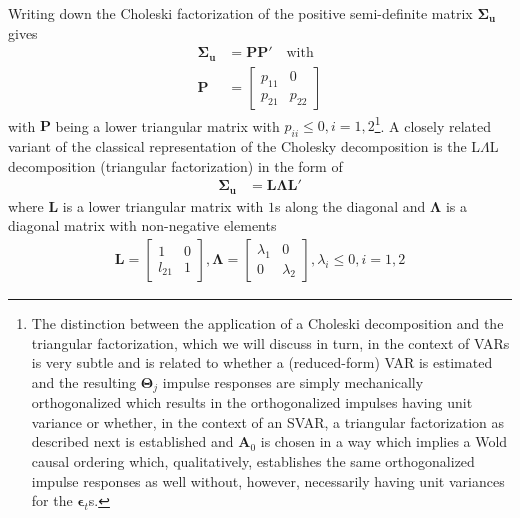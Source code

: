 \documentclass[a4paper,11pt,listof=nochaptergap,oneside,pointednumbers,bibtotoc,bigheadings,liststotoc,hidelinks]{scrbook}
\theoremstyle{mysatz}
\theoremstyle{mydefinition}
\theoremstyle{mytheorem}
\theoremstyle{mybemerkung}
\newcommand{\vect}[1]{\boldsymbol{\mathbf{#1}}}
\begin{document}
Writing down the Choleski factorization of the positive semi-definite matrix $\vect{\Sigma_u}$ gives
\begin{equation} \label{eq:svar14}
\begin{split}
 		\vect{\Sigma_u} & = \vect{P}\vect{P'} \quad \text{with} \\
		\vect{P} & = \begin{bmatrix}
    							p_{11} & 0 \\
							p_{21} & p_{22}
 							\end{bmatrix}
\end{split}								
\end{equation}
with $\vect{P}$ being a lower triangular matrix with $p_{ii} \leq 0, i = 1, 2$\footnote{The distinction between the application of a Choleski decomposition and the triangular factorization, which we will discuss in turn, in the context of VARs is very subtle and is related to whether a (reduced-form) VAR is estimated and the resulting $\vect{\Theta}_j$ impulse responses are simply mechanically orthogonalized which results in the orthogonalized impulses having unit variance or whether, in the context of an SVAR, a triangular factorization as described next is established and $\vect{A}_0$ is chosen in a way which implies a Wold causal ordering which, qualitatively, establishes the same orthogonalized impulse responses as well without, however, necessarily having unit variances for the $\vect{\epsilon}_t$s.}. A closely related variant of the classical representation of the Cholesky decomposition is the L$\Lambda$L decomposition (triangular factorization) in the form of 
\begin{equation} \label{eq:svar15}
\begin{split}
 		\vect{\Sigma_u} & = \vect{L}\vect{\Lambda}\vect{L'}
\end{split}								
\end{equation}
where $\vect{L}$ is a lower triangular matrix with $1$s along the diagonal and $\vect{\Lambda}$ is a diagonal matrix with non-negative elements
\begin{equation} \label{eq:svar16}
\begin{split}
	\vect{L} =  \begin{bmatrix}
    				1 & 0 \\
				l_{21} & 1 
 				\end{bmatrix}, 
				\vect{\Lambda} = 
					\begin{bmatrix}
    					\lambda_1 & 0 \\
					0 & \lambda_2 
 					\end{bmatrix},
					\lambda_i \leq 0, i = 1, 2
\end{split}								
\end{equation}
\end{document}
